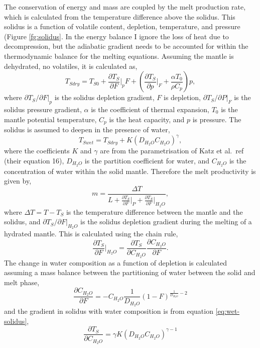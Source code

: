 The conservation of energy and mass are coupled by the melt production rate, which is calculated from the temperature difference above the solidus. This solidus is a function of volatile content, depletion, temperature, and pressure (Figure \ref{fg:solidus}. In the energy balance I ignore the loss of heat due to decompression, but the adiabatic gradient needs to be accounted for within the thermodynamic balance for the melting equations. Assuming the mantle is dehydrated, no volatiles, it is calculated as,
\begin{equation}
T_{Sdry} = T_{S0} + \frac{\partial T_{S}}{\partial F}\vert_{p}F + \left(\frac{\partial T_{S}}{\partial p}\vert_{F} + \frac{\alpha T_{0}}{\rho C_{p}}\right)p,
\label{eq:dry-solidus}
\end{equation}
where $\partial T_{S}/\partial F\vert_{p}$ is the solidus depletion gradient, $F$ is depletion, $\partial T_{S}/\partial P\vert_{F}$ is the solidus pressure gradient, $\alpha$ is the coefficient of thermal expansion, $T_{0}$ is the mantle potential temperature, $C_{p}$ is the heat capacity, and $p$ is pressure. The solidus is assumed to deepen in the presence of water,
\begin{equation}
T_{Swet} = T_{Sdry} + K\left(D_{H_{2}O}C_{H_{2}O}\right)^{\gamma},
\label{eq:wet-solidus}
\end{equation}
where the coefficients $K$ and $\gamma$ are from the parametrisation of Katz et al.~ref \cite{katz-etal-2003} (their equation 16), $D_{H_{2}O}$ is the partition coefficient for water, and $C_{H_{2}O}$ is the concentration of water within the solid mantle. Therefore the melt productivity is given by,
\begin{equation}
m = \frac{\Delta T}{L + \frac{\partial T_{S}}{\partial F}\vert_{P} + \frac{\partial T_{S}}{\partial F}\vert_{H_{2}O}},
\label{eq:melt-productivity}
\end{equation}
where $\Delta T = T-T_{S}$ is the temperature difference between the mantle and the solidus, and $\partial T_{S}/\partial F\vert_{H_{2}O}$ is the solidus depletion gradient during the melting of a hydrated mantle. This is calculated using the chain rule,
\begin{equation}
\frac{\partial T_{S}}{\partial F}\vert_{H_{2}O} = \frac{\partial T_{S}}{\partial C_{H_{2}O}} \frac{\partial C_{H_{2}O}}{\partial F}.
\end{equation}
The change in water composition as a function of depletion is calculated  assuming a mass balance between the partitioning of water between the solid and melt phase,
\begin{equation}
\frac{\partial C_{H_{2}O}}{\partial F} = -C_{H_{2}O} \frac{1}{D_{H_{2}O}}\left(1-F\right)^{\frac{1}{D_{H_{2}O}}-2}
\end{equation}
and the gradient in solidus with water composition is from equation \ref{eq:wet-solidus},
\begin{equation}
\frac{\partial T_{S}}{\partial C_{H_{2}O}} = \gamma K\left(D_{H_{2}O}C_{H_{2}O}\right)^{\gamma-1}
\end{equation}

